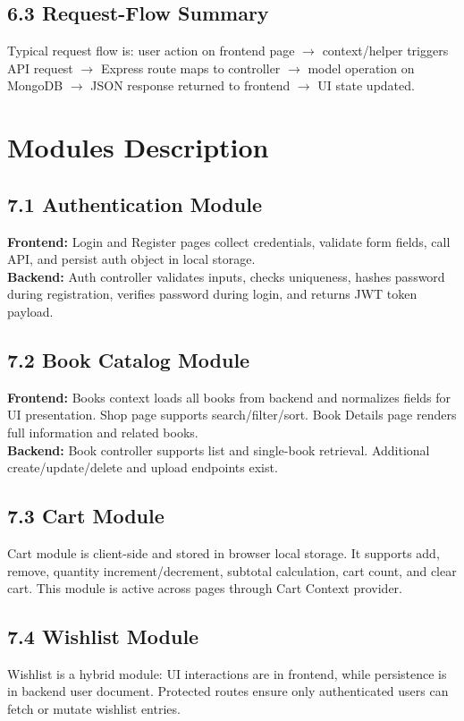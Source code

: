 \documentclass[12pt,a4paper]{report}
\begin{document}
\section*{6.3 Request-Flow Summary}
Typical request flow is: user action on frontend page $\rightarrow$ context/helper triggers API request $\rightarrow$ Express route maps to controller $\rightarrow$ model operation on MongoDB $\rightarrow$ JSON response returned to frontend $\rightarrow$ UI state updated.

\chapter{Modules Description}
\section*{7.1 Authentication Module}
\textbf{Frontend:} Login and Register pages collect credentials, validate form fields, call API, and persist auth object in local storage.\\
\textbf{Backend:} Auth controller validates inputs, checks uniqueness, hashes password during registration, verifies password during login, and returns JWT token payload.

\section*{7.2 Book Catalog Module}
\textbf{Frontend:} Books context loads all books from backend and normalizes fields for UI presentation. Shop page supports search/filter/sort. Book Details page renders full information and related books.\\
\textbf{Backend:} Book controller supports list and single-book retrieval. Additional create/update/delete and upload endpoints exist.

\section*{7.3 Cart Module}
Cart module is client-side and stored in browser local storage. It supports add, remove, quantity increment/decrement, subtotal calculation, cart count, and clear cart. This module is active across pages through Cart Context provider.

\section*{7.4 Wishlist Module}
Wishlist is a hybrid module: UI interactions are in frontend, while persistence is in backend user document. Protected routes ensure only authenticated users can fetch or mutate wishlist entries.
\end{document}

